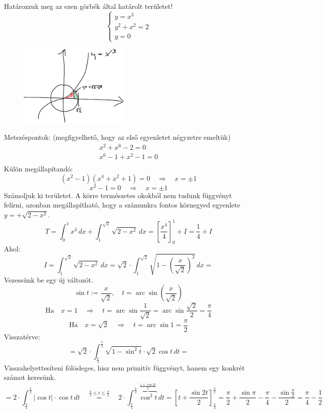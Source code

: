 \documentclass[a4paper,11.5pt]{article}
\DeclareMathOperator{\arc}{arc}
\begin{document}
	\begin{example}Határozzuk meg az ezen görbék által határolt területet!
		\[\begin{cases}
			y=x^3\\
			y^2+x^2=2\\
			y=0
		\end{cases}\]
		\begin{figure}[H]
			\centering
			\includegraphics[height=4cm]{../2zh/kepek/09.png}
			\caption{}
		\end{figure}
		Metszéspontok: (megfigyelhető, hogy az első egyenletet négyzetre emeltük)
		\begin{align*}
			x^2+x^6-2=0\\
			x^6-1+x^2-1=0\\
		\end{align*}
		Külön megállapítandó:
		\[(x^2-1)(x^4+x^2+1)=0\quad \Rightarrow\quad x=\pm1 \]
		\[ x^2-1=0\quad \Rightarrow\quad x=\pm1 \]
		Számoljuk ki  területet. A körre természetes okokból nem tudunk függvényt felírni, azonban megállapítható, hogy a számunkra fontos körnegyed egyenlete $y=+\sqrt{2-x^2}$.
		\[ T=\int_0^1x^3\,dx+\int_1^{\sqrt{2}}\sqrt{2-x^2}\,dx=\left[\frac{x^4}{4}\right]_0^1+I=\frac{1}{4}+I \]
		Ahol:
		\[ I=\int_1^{\sqrt{2}}\sqrt{2-x^2}\,dx=\sqrt{2}\cdot\int_1^{\sqrt{2}}\sqrt{1-\left(\frac{x}{\sqrt{2}}\right)^2}\,dx= \]
		Vezessünk be egy új változót.
		\[ \sin t:=\frac{x}{\sqrt{2}},\quad t=\arc\sin\left(\frac{x}{\sqrt{2}}\right) \]
		\[\text{Ha}\quad x=1\quad \Rightarrow\quad t=\arc\sin\frac{1}{\sqrt{2}}=\arc\sin\frac{\sqrt{2}}{2}=\frac{\pi}{4} \]
		\[\text{Ha}\quad x=\sqrt{2}\quad \Rightarrow\quad t=\arc\sin1=\frac{\pi}{2} \]
		Visszatérve:
		\[ =\sqrt{2}\cdot\int_{\frac{\pi}{4}}^{\frac{\pi}{2}}\sqrt{1-\sin^2t}\cdot\sqrt{2}\cos t\,dt= \]
		Visszahelyettesíteni fölösleges, hisz nem primitív függvényt, hanem egy konkrét számot keresünk.
		\[ =2\cdot\int_{\frac{\pi}{4}}^{\frac{\pi}{2}}|\cos t|\cdot\cos t\,dt\quad \overset{\frac{\pi}{4}\leq t\leq \frac{\pi}{2}}{=}\quad2\cdot\int_{\frac{\pi}{4}}^{\frac{\pi}{2}}\overbrace{\cos^2t}^{\frac{1+\cos2t}{2}}\,dt=\left[t+\frac{\sin2t}{2}\right]_{\frac{\pi}{4}}^{\frac{\pi}{2}}=\frac{\pi}{2}+\frac{\sin\pi}{2}-\frac{\pi}{4}-\frac{\sin\frac{\pi}{2}}{2}=\frac{\pi}{4}-\frac{1}{2}  \]
	\end{example}
\end{document}
